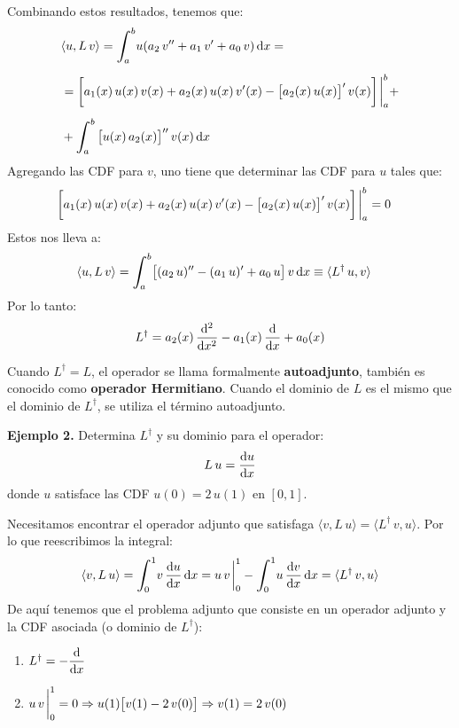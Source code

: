\documentclass[12pt]{article}
\newcommand{\pderivada}[1]{\ensuremath{{#1}^{\prime}}}
\newcommand{\sderivada}[1]{\ensuremath{{#1}^{\prime \prime}}}
\def\scaleint#1{\vcenter{\hbox{\scaleto[3ex]{\displaystyle\int}{#1}}}}
\def\bs{\mkern-12mu}
\numberwithin{equation}{section}
\begin{document}
Combinando estos resultados, tenemos que:
\begin{eqnarray}
\begin{aligned}[b]
&\langle u , L \, v \rangle =  \scaleint{6ex}_{\bs a}^{b} u (a_{2} \, \sderivada{v} + a_{1} \, \pderivada{v} + a_{0} \, v) \dd{x} = \\[0.5em] 
&= \bigg[ a_{1}(x) \, u(x) \, v(x) + a_{2}(x) \, u(x) \, \pderivada{v}(x) - \big[ a_{2}(x) \, u(x) \big]^{\prime} \, v(x) \bigg] \eval_{a}^{b} + \\[0.5em]
&+ \scaleint{6ex}_{\bs a}^{b} \, \big[ u(x) \, a_{2} (x) \big]^{\prime \prime} \, v(x) \dd{x}
\end{aligned}
\label{eq:ecuacion_04_19}
\end{eqnarray}
Agregando las CDF para $v$,  uno tiene que determinar las CDF para $u$ tales que:
\begin{align*}
&\bigg[ a_{1}(x) \, u(x) \, v(x) + a_{2}(x) \, u(x) \, \pderivada{v}(x) - \big[ a_{2}(x) \, u(x) \big]^{\prime} \, v(x) \bigg] \eval_{a}^{b} = 0
\end{align*}
Estos nos lleva a:
\begin{align*}
\langle u , L \, v \rangle &= \scaleint{6ex}_{\bs a}^{b}  \big[ (a_{2} \, u)^{\prime \prime} - (a_{1} \, u)^{\prime} + a_{0} \, u \big] \, v \dd{x} \equiv \langle L^{\dagger} \, u, v \rangle 
\end{align*}
Por lo tanto:
\begin{align}
L^{\dagger} = a_{2}(x) \, \dv[2]{x} - a_{1}(x) \, \dv{x} + a_{0}(x)
\label{eq:ecuacion_04_20}
\end{align}

Cuando $L^{\dagger} = L$,  el operador se llama formalmente \textbf{autoadjunto}, también es conocido como \textbf{operador Hermitiano}. Cuando el dominio de $L$ es el mismo que el dominio de $L^{\dagger}$, se utiliza el término autoadjunto.
\par
\noindent
\textbf{Ejemplo 2. } Determina $L^{\dagger}$ y su dominio para el operador:
\begin{align*}
L \, u = \dv{u}{x}
\end{align*}
donde $u$ satisface las CDF $u(0) = 2 \, u(1)$ en $[0, 1]$.
\par
Necesitamos encontrar el operador adjunto que satisfaga $\langle v, L \, u \rangle = \langle L^{\dagger} \, v, u \rangle$. Por lo que reescribimos la integral:
\begin{eqnarray*}
\langle v, L \, u \rangle =  \scaleint{6ex}_{\bs 0}^{1} v \, \dv{u}{x} \dd{x} =  u \, v \eval_{0}^{1} - \scaleint{6ex}_{\bs 0}^{1} u \, \dv{v}{x} \dd{x} =  \langle L^{\dagger} \, v, u \rangle
\end{eqnarray*}
De aquí tenemos que el problema adjunto que consiste en un operador adjunto y la CDF asociada (o dominio de $L^{\dagger}$):
\begin{enumerate}
\item $L^{\dagger} = - \displaystyle \dv{x}$
\item $\displaystyle u \, v \eval_{0}^{1} = 0 \Rightarrow u (1) \big[ v(1) - 2 \, v(0) \big] \Rightarrow v (1) = 2 \, v(0)$
\end{enumerate}
\end{document}
